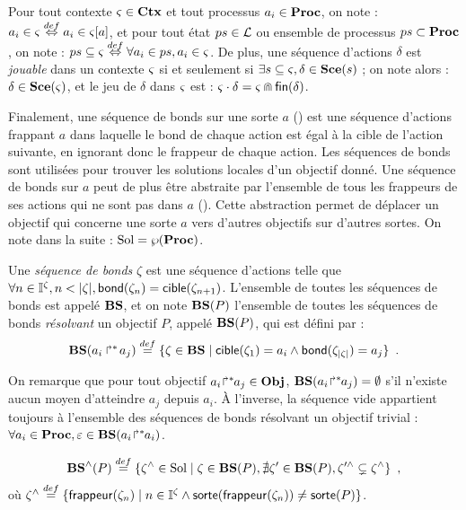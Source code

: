 Pour tout contexte $\varsigma \in \mathbf{Ctx}$ et tout processus $a_i \in \mathbf{Proc}$, on note :
$a_i \in \varsigma \stackrel{def}\Leftrightarrow a_i \in {\varsigma[a]}$,
et pour tout état $ps \in \mathcal{L}$ ou ensemble de processus $ps \subset \mathbf{Proc}$, on note :
$ps \subseteq \varsigma \stackrel{def}\Leftrightarrow \forall a_i \in ps, a_i \in \varsigma$.
De plus, une séquence d'actions $\delta$ est \emph{jouable} dans un contexte $\varsigma$
si et seulement si $\exists s \subseteq \varsigma, \delta \in \mathbf{Sce}(s)$ ;
on note alors : $\delta \in \mathbf{Sce}(\varsigma)$,
et le jeu de $\delta$ dans $\varsigma$ est : $\varsigma \cdot \delta = \varsigma \Cap \mathsf{fin}(\delta)$.

Finalement, une séquence de bonds sur une sorte $a$ () est une séquence d'actions
frappant $a$ dans laquelle le bond de chaque action est égal à la cible de l'action suivante,
en ignorant donc le frappeur de chaque action.
Les séquences de bonds sont utilisées pour trouver les solutions locales d'un objectif donné.
Une séquence de bonds sur $a$ peut de plus être abstraite par l'ensemble de tous les frappeurs
de ses actions qui ne sont pas dans $a$ ().
Cette abstraction permet de déplacer un objectif qui concerne une sorte $a$
vers d'autres objectifs sur d'autres sortes.
On note dans la suite : $\mathrm{Sol} = \wp(\mathbf{Proc})$.

\begin{definition}
  Une \emph{séquence de bonds} $\zeta$ est une séquence d'actions telle que
  $\forall n \in \mathbb{I}^{\zeta}, n < |\zeta|, \mathsf{bond}(\zeta_{n}) = \mathsf{cible}(\zeta_{n+1})$.
  L'ensemble de toutes les séquences de bonds est appelé $\mathbf{BS}$,
  et on note $\mathbf{BS}(P)$ l'ensemble de toutes les séquences de bonds \emph{résolvant}
  un objectif $P$, appelé $\mathbf{BS}(P)$, qui est défini par :
    \[ \mathbf{BS}(\mbox{$a_i\Rsh^*\!a_j$}) \stackrel{def}= \{ \zeta \in \mathbf{BS} \mid
      \mathsf{cible}(\zeta_1) = a_i \wedge \mathsf{bond}(\zeta_{|\zeta|}) = a_j \} \enspace. \]
\end{definition}

\noindent
On remarque que pour tout objectif ${a_i\!\Rsh^*\!\!a_j} \in \mathbf{Obj}$,
$\mathbf{BS}({a_i\!\Rsh^*\!\!a_j}) = \emptyset$ s'il n'existe aucun moyen d'atteindre $a_j$ depuis $a_i$.
À l'inverse, la séquence vide appartient toujours à
l'ensemble des séquences de bonds résolvant un objectif trivial :
$\forall a_i \in \mathbf{Proc}, \varepsilon \in \mathbf{BS}({a_i\!\Rsh^*\!\!a_i})$.

\begin{definition}
  \[
    \mathbf{BS}^\wedge(P) \stackrel{def}= \{ \zeta^\wedge \in \mathrm{Sol} \mid \zeta \in \mathbf{BS}(P), \nexists \zeta' \in \mathbf{BS}(P), \zeta'^\wedge \subsetneq \zeta^\wedge \} \enspace,
  \]
  où $\zeta^\wedge \stackrel{def}= \{ \mathsf{frappeur}(\zeta_n) \mid  n \in \mathbb{I}^{\zeta} \wedge \mathsf{sorte}(\mathsf{frappeur}(\zeta_n)) \neq \mathsf{sorte}(P) \}$.
\end{definition}



